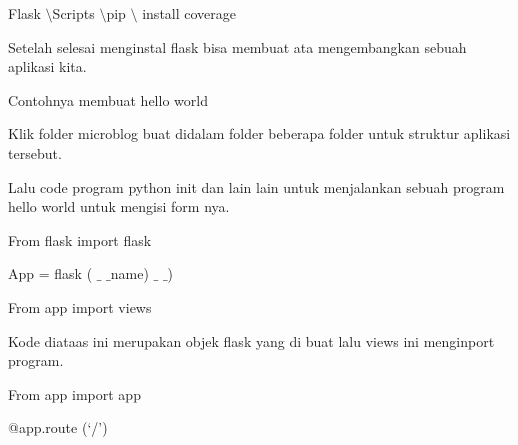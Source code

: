 \vspace{14pt}
\noindent 
{\fontsize{14pt}{14pt}\selectfont Flask $  \setminus  $Scripts $  \setminus  $pip $  \setminus  $ install coverage \\} \par
\vspace{14pt}
\vspace{14pt}
\noindent 
{\fontsize{14pt}{14pt}\selectfont Setelah selesai menginstal flask bisa membuat ata mengembangkan sebuah aplikasi kita.  \\} \par
\noindent 
{\fontsize{14pt}{14pt}\selectfont Contohnya membuat hello world \\} \par
\noindent 
{\fontsize{14pt}{14pt}\selectfont Klik folder microblog buat didalam folder beberapa folder untuk struktur aplikasi tersebut. \\} \par
\vspace{14pt}
\noindent 
{\fontsize{14pt}{14pt}\selectfont Lalu code program python init dan lain lain untuk menjalankan sebuah program hello world untuk mengisi form nya. \\} \par
\noindent 
{\fontsize{14pt}{14pt}\selectfont From flask import flask \\} \par
\vspace{14pt}
\noindent 
{\fontsize{14pt}{14pt}\selectfont App = flask ( $  \_  $ $  \_  $name) $  \_  $ $  \_  $) \\} \par
\vspace{14pt}
\noindent 
{\fontsize{14pt}{14pt}\selectfont From app import views \\} \par
\vspace{14pt}
\noindent 
{\fontsize{14pt}{14pt}\selectfont Kode diataas ini merupakan objek flask yang di buat lalu views ini menginport program. \\} \par
\vspace{14pt}
\noindent 
{\fontsize{14pt}{14pt}\selectfont From app import app \\} \par
\vspace{14pt}
\noindent 
{\fontsize{14pt}{14pt}\selectfont @app.route (‘/’) \\} \par
\vspace{14pt}
